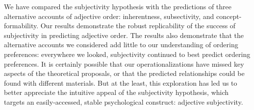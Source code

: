 \documentclass[12pt]{article}
\newcommand{\jd}[1]{\textcolor{red}{[jd: #1]}}
\begin{document}
We have compared the subjectivity hypothesis with the predictions of three alternative accounts of adjective order: inherentness, subsectivity, and concept-formability. Our results demonstrate the robust replicability of the success of subjectivity in predicting adjective order. The results also demonstrate that the alternative accounts we considered add little to our understanding of ordering preferences: everywhere we looked, subjectivity continued to best predict ordering preferences. %
It is certainly possible that our operationalizations have missed key aspects of the theoretical proposals, or that the predicted relationships could be found with different materials. 
But at the least, this exploration has led us to better appreciate the intuitive appeal of the subjectivity hypothesis, which targets an easily-accessed, stable psychological construct: adjective subjectivity.



 

\end{document}
